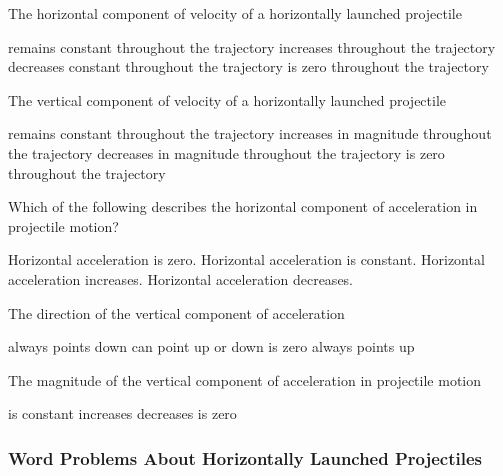 \documentclass[../main-physics-workbook.tex]{subfiles}
\begin{document}
\begin{questions}
\question
The horizontal component of velocity of a horizontally launched projectile

\begin{randomizechoices}
    \correctchoice remains constant throughout the trajectory
    \choice increases throughout the trajectory
    \choice decreases constant throughout the trajectory
    \choice is zero throughout the trajectory
\end{randomizechoices}

\question
The vertical component of velocity of a horizontally launched projectile

\begin{randomizechoices}
    \choice remains constant throughout the trajectory
    \choice increases in magnitude throughout the trajectory
    \choice decreases in magnitude throughout the trajectory
    \choice is zero throughout the trajectory
\end{randomizechoices}

\question
Which of the following describes the horizontal component of acceleration in projectile motion?

\begin{randomizechoices}
    \correctchoice Horizontal acceleration is zero.
    \choice Horizontal acceleration is constant.
    \choice Horizontal acceleration increases.
    \choice Horizontal acceleration decreases.
\end{randomizechoices}

\question
The direction of the vertical component of acceleration

\begin{randomizechoices}
    \correctchoice always points down
    \choice can point up or down
    \choice is zero
    \choice always points up
\end{randomizechoices}

\question
The magnitude of the vertical component of acceleration in projectile motion

\begin{randomizechoices}
    \correctchoice is constant
    \choice increases
    \choice decreases
    \choice is zero
\end{randomizechoices}
\end{questions}

\clearpage

\subsubsection{Word Problems About Horizontally Launched Projectiles}
\end{document}
